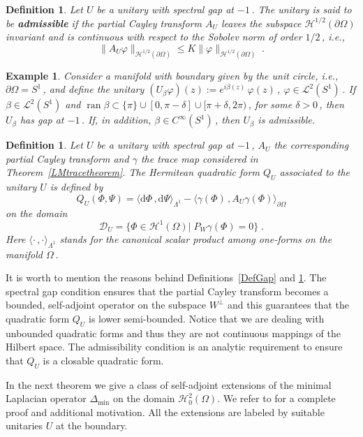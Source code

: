 \documentclass[a4paper,12pt]{amsart}
\DeclareMathOperator{\ran}{ran}
\newcommand{\scalar}[2]{\langle#1\,,#2\rangle}
\newcommand{\scalarb}[2]{\langle#1\,,#2\rangle_{\partial \Omega}}
\newcommand{\norm}[1]{\|#1\|}
\renewcommand{\H}{\mathcal{H}}
\renewcommand{\L}{\mathcal{L}}
\newcommand{\D}{\mathcal{D}}
\renewcommand{\d}{\mathrm{d}}
\newcommand{\pO}{{\partial \Omega}}
\newcommand{\1}{\mathbb{I}}
\newtheorem{definition}[theorem]{Definition}
\newtheorem{example}[theorem]{Example}
\numberwithin{equation}{section}
\numberwithin{theorem}{section}
\begin{document}
\begin{definition}\label{def:admissible}
Let $U$ be a unitary with spectral gap at $-1$\,. The unitary is said to be \textbf{admissible} if the partial Cayley transform
$A_U$ leaves the subspace $\H^{1/2}(\pO)$ invariant and is continuous with respect to the Sobolev norm of order $1/2$\,, i.e.,
$$\norm{A_U\varphi}_{\H^{1/2}(\pO)}\leq K \norm{\varphi}_{\H^{1/2}(\pO)}\;.$$
\end{definition}


\begin{example}
Consider a manifold with boundary given by the unit circle, i.e., $\partial\Omega=S^1$\,,
and define the unitary $(U_\beta\varphi)(z):=e^{i\beta(z)}\,\varphi(z)$\,, $\varphi\in \L^2(S^1)$\,.
If $\beta\in \L^2(S^1)$ and $\ran\beta\subset\{\pi\}\cup [0,\pi-\delta]\cup [\pi+\delta,2\pi)$\,, for some $\delta >0$\,, then $U_\beta$ has gap
at $-1$\,. If, in addition, $\beta\in C^\infty(S^1)$\,, then $U_\beta$ is admissible.
\end{example}

\begin{definition}\label{DefQU}
Let $U$ be a unitary with spectral gap at $-1$\,, $A_U$ the corresponding partial Cayley transform and $\gamma$
the trace map considered in Theorem~\ref{LMtracetheorem}.
The Hermitean quadratic form $Q_U$ associated to the unitary $U$ is defined by
$$Q_U(\Phi,\Psi)=\scalar{\d\Phi}{\d\Psi}_{\Lambda^1}-\scalarb{\gamma(\Phi)}{A_U\gamma(\Phi)}$$
on the domain
$$\D_U=\bigl\{ \Phi\in\H^1(\Omega)\bigr|   \; P_W\gamma(\Phi)=0 \bigr\}\;.$$ 
Here $\scalar{\cdot}{\cdot}_{\Lambda^1}$ 
stands for the canonical scalar product among one-forms on the manifold $\Omega$\,.
\end{definition}


It is worth to mention the reasons behind Definitions~\ref{DefGap} and \ref{def:admissible}. 
The spectral gap condition ensures that the partial Cayley transform becomes a bounded, self-adjoint operator on the subspace
$W^\perp$ and this guarantees that the quadratic form $Q_U$ is lower semi-bounded. Notice that we are dealing with 
unbounded quadratic forms and thus they are not continuous mappings of the Hilbert space. The admissibility condition is 
an analytic requirement to ensure that $Q_U$ is a closable quadratic form. 

In the next theorem we give a class of self-adjoint extensions of the minimal Laplacian
operator $\Delta_{\mathrm{min}}$ on the domain $\mathcal{H}^2_0(\Omega)$.  
We refer to \cite[Section~4]{ILP13} for a complete proof and additional motivation.
All the extensions are labeled by suitable unitaries $U$ at the boundary.
\end{document}
